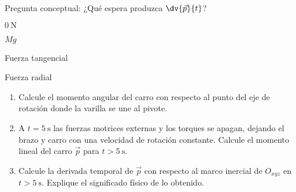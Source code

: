\documentclass[11pt,spanish,a4paper]{article}
\begin{document}
\begin{enumerate}
Pregunta conceptual:
¿Qué espera produzca $\dv{\vec{p}}{t}$?
\begin{enumerate*}[label=\alph*),itemjoin={,\quad}]
	\item $\SI{0}{\newton}$
	\item $M g$
	\item Fuerza tangencial
	\item Fuerza radial
\end{enumerate*}

\begin{enumerate}[label=\alph*)]
	\item Calcule el momento angular del carro con respecto al punto del eje de rotación donde la varilla se une al pivote.
	\item A $t= \SI{5}{\second}$ las fuerzas motrices externas y los torques se apagan, dejando el brazo y carro con una velocidad de rotación constante.
	Calcule el momento lineal del carro $\vec{p}$ para $t>\SI{5}{\second}$.
	\item Calcule la derivada temporal de $\vec{p}$ con respecto al marco inercial de $O_{xyz}$ en $t> \SI{5}{\second}$.
	Explique el significado físico de lo obtenido.
\end{enumerate}


\end{enumerate}
\end{document}
